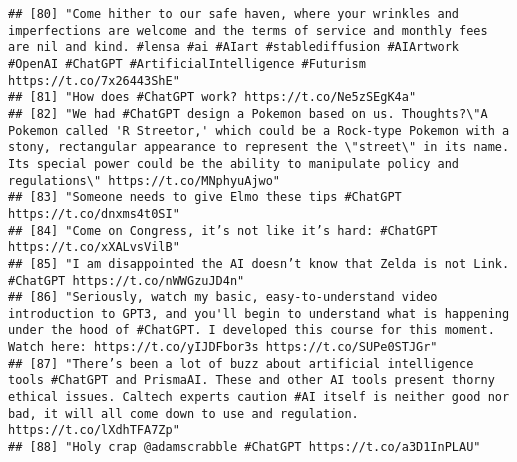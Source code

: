 \documentclass[
]{article}
\begin{document}
\begin{verbatim}
## [80] "Come hither to our safe haven, where your wrinkles and imperfections are welcome and the terms of service and monthly fees are nil and kind. #lensa #ai #AIart #stablediffusion #AIArtwork #OpenAI #ChatGPT #ArtificialIntelligence #Futurism https://t.co/7x26443ShE"                                         
## [81] "How does #ChatGPT work? https://t.co/Ne5zSEgK4a"                                                                                                                                                                                                                                                               
## [82] "We had #ChatGPT design a Pokemon based on us. Thoughts?\"A Pokemon called 'R Streetor,' which could be a Rock-type Pokemon with a stony, rectangular appearance to represent the \"street\" in its name. Its special power could be the ability to manipulate policy and regulations\" https://t.co/MNphyuAjwo"
## [83] "Someone needs to give Elmo these tips #ChatGPT https://t.co/dnxms4t0SI"                                                                                                                                                                                                                                        
## [84] "Come on Congress, it’s not like it’s hard: #ChatGPT https://t.co/xXALvsVilB"                                                                                                                                                                                                                                   
## [85] "I am disappointed the AI doesn’t know that Zelda is not Link. #ChatGPT https://t.co/nWWGzuJD4n"                                                                                                                                                                                                                
## [86] "Seriously, watch my basic, easy-to-understand video introduction to GPT3, and you'll begin to understand what is happening under the hood of #ChatGPT. I developed this course for this moment. Watch here: https://t.co/yIJDFbor3s https://t.co/SUPe0STJGr"                                                   
## [87] "There’s been a lot of buzz about artificial intelligence tools #ChatGPT and PrismaAI. These and other AI tools present thorny ethical issues. Caltech experts caution #AI itself is neither good nor bad, it will all come down to use and regulation. https://t.co/lXdhTFA7Zp"                                
## [88] "Holy crap @adamscrabble #ChatGPT https://t.co/a3D1InPLAU"                                                                                                                                                                                                                                                      

\end{verbatim}
\end{document}

